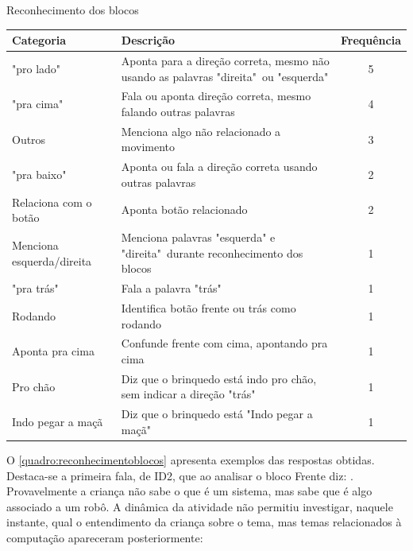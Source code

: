\begin{quadro}[!h]
   \begin{table_env}
   \caption{Reconhecimento dos blocos}
    \label{quadro:reconhecimentoblocos}
    \begin{tabular}{@{}l m{} c@{}}
        \toprule
        Categoria                   & Descrição                                                                  & Frequência \\ \midrule
        "pro lado"                  & Aponta para a direção correta, mesmo não usando as palavras "direita"\ ou "esquerda"                                           & 5 \\
        "pra cima"                  & Fala ou aponta direção correta, mesmo falando outras palavras              & 4 \\
        Outros                      & Menciona algo não relacionado a movimento                                  & 3 \\
        "pra baixo"                 & Aponta ou fala a direção correta usando outras palavras                    & 2 \\
        Relaciona com o botão       & Aponta botão relacionado                                                   & 2 \\
        Menciona esquerda/direita   & Menciona palavras "esquerda" e "direita"\ durante reconhecimento dos blocos & 1 \\
        "pra trás"                  & Fala a palavra "trás"                                                      & 1 \\
        Rodando                     & Identifica botão frente ou trás como rodando                               & 1 \\
        Aponta pra cima             & Confunde frente com cima, apontando pra cima                               & 1 \\
        Pro chão                    & Diz que o brinquedo está indo pro chão, sem indicar a direção "trás"       & 1 \\ \nidrule
        Indo pegar a maçã           & Diz que o brinquedo está "Indo pegar a maçã"                               & 1 \\ \bottomrule
        \end{tabular}
   \end{table_env}
   \sourceauthor
\end{quadro}

O \autoref{quadro:reconhecimentoblocos} apresenta exemplos das respostas obtidas. Destaca-se a primeira fala, de ID2, que ao analisar o bloco Frente diz: . Provavelmente a criança não sabe o que é um sistema, mas sabe que é algo associado a um robô. A dinâmica da atividade não permitiu investigar, naquele instante, qual o entendimento da criança sobre o tema, mas temas relacionados à computação apareceram posteriormente:

